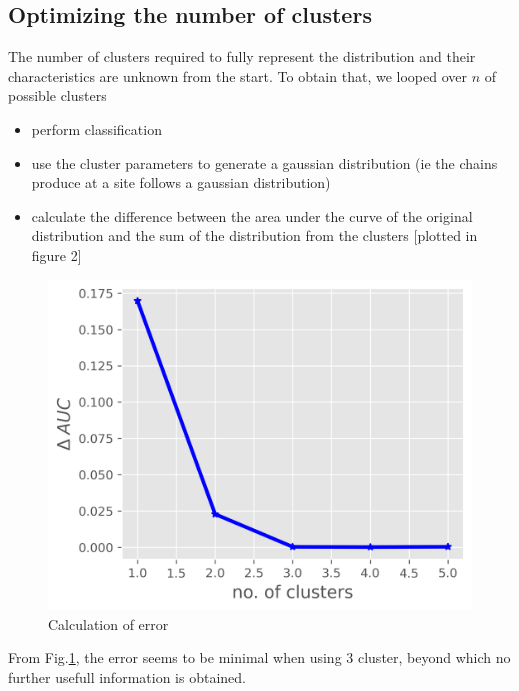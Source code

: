 \documentclass[12pt,letter]{article}
\begin{document}
\subsection*{Optimizing the number of clusters}
The number of clusters required to fully represent the distribution and their characteristics are unknown from the start. To obtain that, we looped over $n$ of possible clusters
\begin{itemize}
	\item perform classification
	\item use the cluster parameters to generate a gaussian distribution (ie the chains produce at a site follows a gaussian distribution)
	\item calculate the difference between the area under the curve of the original distribution and the sum of the distribution from the clusters [plotted in figure 2]
\end{itemize} 
\begin{figure}[!htb]
	\begin{center}	
	\includegraphics[scale=1]{figures/error_curve}
	\caption{Calculation of error}
	\label{fig:error}
	\end{center}
\end{figure}
From Fig.\ref{fig:error}, the error seems to be minimal when using 3 cluster, beyond which no further usefull information is obtained. 
\end{document}

